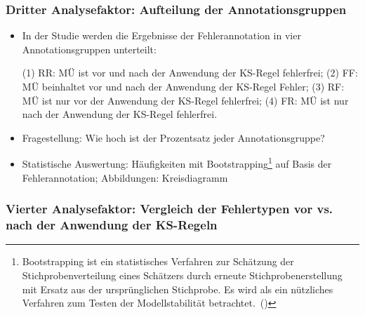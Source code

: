 \subsubsection{Dritter Analysefaktor: Aufteilung der Annotationsgruppen}

\begin{itemize}
\item In der Studie werden die Ergebnisse der Fehlerannotation in vier Annotationsgruppen unterteilt:

(1) RR: MÜ ist vor und nach der Anwendung der KS-Regel fehlerfrei; (2) FF: MÜ beinhaltet vor und nach der Anwendung der KS-Regel Fehler; (3) RF: MÜ ist nur vor der Anwendung der KS-Regel fehlerfrei; (4) FR: MÜ ist nur nach der Anwendung der KS-Regel fehlerfrei.

\item Fragestellung: Wie hoch ist der Prozentsatz jeder Annotationsgruppe?
\item Statistische Auswertung: Häufigkeiten mit Bootstrapping\footnote{\textrm{Bootstrapping ist ein statistisches Verfahren zur Schätzung der Stichprobenverteilung eines Schätzers durch erneute Stichprobenerstellung mit Ersatz aus der ursprünglichen Stichprobe. Es wird als ein nützliches Verfahren zum Testen der Modellstabilität betrachtet.~(\citealt{IBMnodate})}} auf Basis der Fehlerannotation; Abbildungen: Kreisdiagramm
\end{itemize}

\subsubsection{Vierter Analysefaktor: Vergleich der Fehlertypen vor vs. nach der Anwendung der KS-Regeln}

